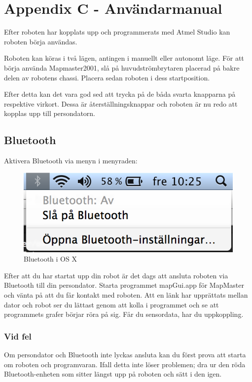 \documentclass[a4paper,12pt,fleqn]{article}
\begin{document}
\section*{Appendix C - Användarmanual}
Efter roboten har kopplats upp och programmerats med Atmel Studio kan roboten börja användas. 

Roboten kan köras i två lägen, antingen i manuellt eller autonomt läge. För att börja använda Mapmaster2001, slå på huvudströmbrytaren placerad på bakre delen av robotens chassi. Placera sedan roboten i dess startposition. 

Efter detta kan det vara god sed att trycka på de båda svarta knapparna på respektive virkort. Dessa är återställningsknappar och roboten är nu redo att kopplas upp till persondatorn. 

\subsection*{Bluetooth}
Aktivera Bluetooth via menyn i menyraden: 

\begin{figure}[htp] %
  \begin{center}
  \includegraphics[keepaspectratio=true,width=0.5\linewidth]{bilder/bluetooth.png}  %
  \end{center}
  \caption{Bluetooth i OS X} %
  \label{fig:bluetooth}
\end{figure}

Efter att du har startat upp din robot är det dags att ansluta roboten via Bluetooth till din persondator. Starta programmet mapGui.app för MapMaster och vänta på att du får kontakt med roboten. Att en länk har upprättats mellan dator och robot ser du lättast genom att kolla i programmet och se att programmets grafer börjar röra på sig. Får du sensordata, har du uppkoppling. 

\subsubsection*{Vid fel}
Om persondator och Bluetooth inte lyckas ansluta kan du först prova att starta om roboten och programvaran. Ifall detta inte löser problemen; dra ur den röda Bluetooth-enheten som sitter längst upp på roboten och sätt i den igen. 
\end{document}
